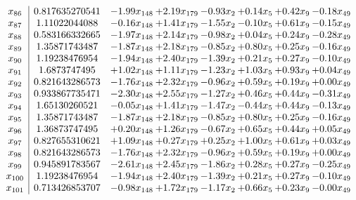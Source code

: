 \documentclass[8pt]{article}
\begin{document}
\[\begin{array}{c| c c@{\hskip 2pt} c@{\hskip 2pt} c@{\hskip 2pt} c@{\hskip 2pt} c@{\hskip 2pt} c@{\hskip 2pt} }
 x_{86}   &  0.817635270541 & -1.99 x_{148} & +  2.19 x_{179} & -0.93 x_{2} & +  0.14 x_{5} & +  0.42 x_{9} & -0.18 x_{49}\\
 x_{87}   &  1.11022044088 & -0.16 x_{148} & +  1.41 x_{179} & -1.55 x_{2} & -0.10 x_{5} & +  0.61 x_{9} & -0.15 x_{49}\\
 x_{88}   &  0.583166332665 & -1.97 x_{148} & +  2.14 x_{179} & -0.98 x_{2} & +  0.04 x_{5} & +  0.24 x_{9} & -0.28 x_{49}\\
 x_{89}   &  1.35871743487 & -1.87 x_{148} & +  2.18 x_{179} & -0.85 x_{2} & +  0.80 x_{5} & +  0.25 x_{9} & -0.16 x_{49}\\
 x_{90}   &  1.19238476954 & -1.94 x_{148} & +  2.40 x_{179} & -1.39 x_{2} & +  0.21 x_{5} & +  0.27 x_{9} & -0.10 x_{49}\\
 x_{91}   &  1.6873747495 & +  1.02 x_{148} & +  1.11 x_{179} & -1.23 x_{2} & +  1.03 x_{5} & +  0.93 x_{9} & +  0.04 x_{49}\\
 x_{92}   &  0.821643286573 & -1.76 x_{148} & +  2.32 x_{179} & -0.96 x_{2} & +  0.59 x_{5} & +  0.19 x_{9} & +  0.00 x_{49}\\
 x_{93}   &  0.933867735471 & -2.30 x_{148} & +  2.55 x_{179} & -1.27 x_{2} & +  0.46 x_{5} & +  0.44 x_{9} & -0.31 x_{49}\\
 x_{94}   &  1.65130260521 & -0.05 x_{148} & +  1.41 x_{179} & -1.47 x_{2} & -0.44 x_{5} & +  0.44 x_{9} & -0.13 x_{49}\\
 x_{95}   &  1.35871743487 & -1.87 x_{148} & +  2.18 x_{179} & -0.85 x_{2} & +  0.80 x_{5} & +  0.25 x_{9} & -0.16 x_{49}\\
 x_{96}   &  1.36873747495 & +  0.20 x_{148} & +  1.26 x_{179} & -0.67 x_{2} & +  0.65 x_{5} & +  0.44 x_{9} & +  0.05 x_{49}\\
 x_{97}   &  0.827655310621 & +  1.09 x_{148} & +  0.27 x_{179} & +  0.25 x_{2} & +  1.00 x_{5} & +  0.61 x_{9} & +  0.03 x_{49}\\
 x_{98}   &  0.821643286573 & -1.76 x_{148} & +  2.32 x_{179} & -0.96 x_{2} & +  0.59 x_{5} & +  0.19 x_{9} & +  0.00 x_{49}\\
 x_{99}   &  0.945891783567 & -2.61 x_{148} & +  2.45 x_{179} & -1.86 x_{2} & +  0.28 x_{5} & +  0.27 x_{9} & -0.25 x_{49}\\
 x_{100}   &  1.19238476954 & -1.94 x_{148} & +  2.40 x_{179} & -1.39 x_{2} & +  0.21 x_{5} & +  0.27 x_{9} & -0.10 x_{49}\\
 x_{101}   &  0.713426853707 & -0.98 x_{148} & +  1.72 x_{179} & -1.17 x_{2} & +  0.66 x_{5} & +  0.23 x_{9} & -0.00 x_{49}\\

\end{array}\]
\end{document}
